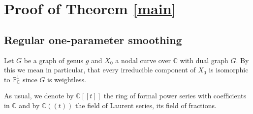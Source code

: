 \documentclass[11pt]{amsart}
\newtheorem{theorem}{Theorem}
\begin{document}


\section{Proof of Theorem \ref{main}}
\subsection{Regular one-parameter smoothing}
Let $G$ be a graph of genus $g$ and $X_0$ a nodal curve over $\mathbb{C}$ with dual graph $G$. By this we mean in particular, that every irreducible component of $X_0$ is isomorphic to $\mathbb{P}^1_{\mathbb{C}}$ since $G$ is weightless.

As usual, we denote by $\mathbb C[[t]]$ the ring of formal power series with coefficients in $\mathbb C$ and by $\mathbb C((t))$ the field of Laurent series, its field of fractions.
\end{document}
